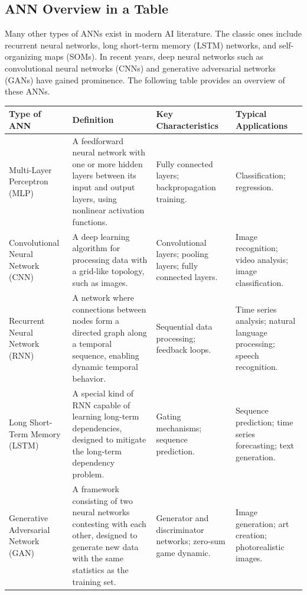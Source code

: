 \documentclass[12pt]{article}
\begin{document}
\subsection{ANN Overview in a Table}
Many other types of ANNs exist in modern AI literature. The classic ones include recurrent neural networks, long short-term memory (LSTM) networks, and self-organizing maps (SOMs). In recent years, deep neural networks such as convolutional neural networks (CNNs) and generative adversarial networks (GANs) have gained prominence. The following table provides an overview of these ANNs.

\begin{landscape}
\begin{table}[ht]
\centering
\begin{tabular}{|p{3cm}|p{8cm}|p{5cm}|p{5cm}|}
\hline
\textbf{Type of ANN} & \textbf{Definition} & \textbf{Key Characteristics} & \textbf{Typical Applications} \\
\hline
Multi-Layer Perceptron (MLP) & A feedforward neural network with one or more hidden layers between its input and output layers, using nonlinear activation functions. & Fully connected layers; backpropagation training. & Classification; regression. \\
\hline
Convolutional Neural Network (CNN) & A deep learning algorithm for processing data with a grid-like topology, such as images. & Convolutional layers; pooling layers; fully connected layers. & Image recognition; video analysis; image classification. \\
\hline
Recurrent Neural Network (RNN) & A network where connections between nodes form a directed graph along a temporal sequence, enabling dynamic temporal behavior. & Sequential data processing; feedback loops. & Time series analysis; natural language processing; speech recognition. \\
\hline
Long Short-Term Memory (LSTM) & A special kind of RNN capable of learning long-term dependencies, designed to mitigate the long-term dependency problem. & Gating mechanisms; sequence prediction. & Sequence prediction; time series forecasting; text generation. \\
\hline
Generative Adversarial Network (GAN) & A framework consisting of two neural networks contesting with each other, designed to generate new data with the same statistics as the training set. & Generator and discriminator networks; zero-sum game dynamic. & Image generation; art creation; photorealistic images. \\

\end{tabular}
\end{table}
\end{landscape}
\end{document}
